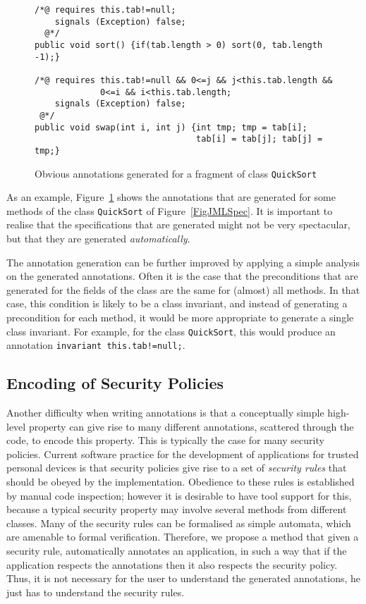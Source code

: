 
\begin{figure}[t!]
{\small
\begin{verbatim}
/*@ requires this.tab!=null;
    signals (Exception) false;
  @*/
public void sort() {if(tab.length > 0) sort(0, tab.length -1);}

/*@ requires this.tab!=null && 0<=j && j<this.tab.length &&
             0<=i && i<this.tab.length;
    signals (Exception) false;
 @*/
public void swap(int i, int j) {int tmp; tmp = tab[i]; 
                                tab[i] = tab[j]; tab[j] = tmp;}
\end{verbatim}
}
\caption{Obvious annotations generated for a fragment of class
\texttt{QuickSort}}\label{FigAnnotSpec} 
\end{figure}

As an example, Figure~\ref{FigAnnotSpec} shows the annotations that
are generated for some methods of the class \texttt{QuickSort} of
Figure~\ref{FigJMLSpec}.  It is important to realise that the
specifications that are generated might not be very spectacular, but
that they are generated \emph{automatically}. %

The annotation generation can be further improved by applying a simple
analysis on the generated annotations. Often it is the case that the
preconditions that are generated for the fields of the class are the
same for (almost) all methods. In that case, this condition is likely
to be a class invariant, and instead of generating a precondition for
each method, it would be more appropriate to generate a single class
invariant. For example, for the class
\texttt{QuickSort}, this would produce an annotation
\texttt{invariant this.tab!=null;}. %

\subsection{Encoding of Security Policies}

Another difficulty when writing annotations is that a conceptually
simple high-level property can give rise to many different
annotations, scattered through the code, to encode this property. This
is typically the case for many security policies. Current software
practice for the development of applications for trusted personal
devices is that security policies give rise to a set of \emph{security
rules} that should be obeyed by the implementation. Obedience to these
rules is established by manual code inspection; however it is
desirable to have tool support for this, because a typical security
property may involve several methods from different classes.  Many of
the security rules can be formalised as simple automata, which are
amenable to formal verification. Therefore, we propose a method that
given a security rule, automatically annotates an application, in such
a way that if the application respects the annotations then it also
respects the security policy. Thus, it is not necessary for the user
to understand the generated annotations, he just has to understand 
the security rules.

